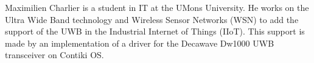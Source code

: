 Maximilien Charlier is a student in IT at the UMons University. 
He works on the Ultra Wide Band technology and Wireless Sensor Networks (WSN) to add the support of the UWB in the Industrial Internet of Things (IIoT). 
This support is made by an implementation of a driver for the Decawave Dw1000 UWB transceiver on Contiki OS.
